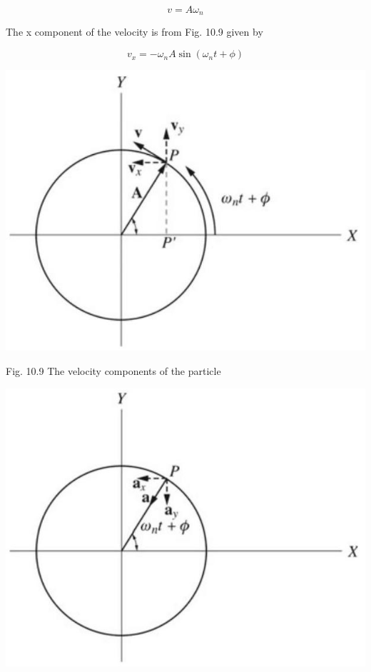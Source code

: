 \documentclass[10pt]{article}
\begin{document}
$$
v=A \omega_{n}
$$

The x component of the velocity is from Fig. 10.9 given by

$$
v_{x}=-\omega_{n} A \sin \left(\omega_{n} t+\phi\right)
$$

\begin{center}
\includegraphics[max width=\textwidth]{2024_09_13_db1f357d2aad0a03eb2eg-167(1)}
\end{center}

Fig. 10.9 The velocity components of the particle

\begin{center}
\includegraphics[max width=\textwidth]{2024_09_13_db1f357d2aad0a03eb2eg-167}
\end{center}
\end{document}
